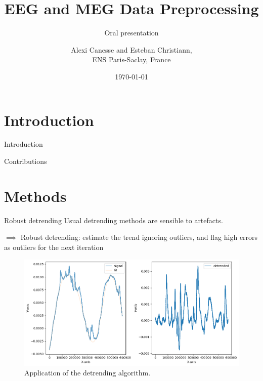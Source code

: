 \documentclass[10pt,serif]{beamer}
\title[] %
{EEG and MEG Data Preprocessing}
\subtitle{Oral presentation}
\author[Esteban Christiann, Alexi Canesse]{{Alexi \sc Canesse} and {Esteban \sc Christiann},\\ ENS Paris-Saclay, France}
\institute[] %
{
    Project for the time series course\\
    Part of the MVA program at ENS Paris-Saclay.\\
}
\date[Oral presentation] %
{\today}
\begin{document}
% 


\begin{frame}
  \titlepage
\end{frame}

\section[\color{white} Introduction]{Introduction}\label{sec:introduction}

\begin{frame}{Introduction}

\end{frame}

\begin{frame}{Contributions}

\end{frame}

\section[\color{white} Methods]{Methods}\label{sec:methods}

\begin{frame}{Robust detrending}
    Usual detrending methods are sensible to artefacts.

    $\implies$ Robust detrending: estimate the trend ignoring outliers, and flag high errors as outliers for the next iteration
    \begin{figure}
        \centering
        \includegraphics[width=.8\textwidth]{figures/detrend_real.png}
        \caption{Application of the detrending algorithm.}
        \label{fig:data}
    \end{figure}
\end{frame}
\end{document}
